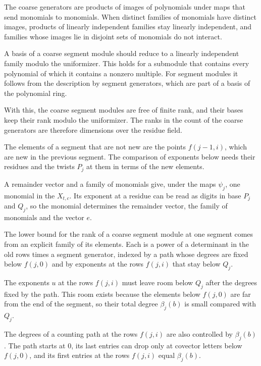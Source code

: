 The coarse generators are products of images of polynomials under maps that send monomials to monomials. When
distinct families of monomials have distinct images, products of linearly independent families stay linearly
independent, and families whose images lie in disjoint sets of monomials do not interact.

A basis of a coarse segment module should reduce to a linearly independent family modulo the uniformizer. This
holds for a submodule that contains every polynomial of which it contains a nonzero multiple. For segment modules
it follows from the description by segment generators, which are part of a basis of the polynomial ring.

With this, the coarse segment modules are free of finite rank, and their bases keep their rank modulo the
uniformizer. The ranks in the count of the coarse generators are therefore dimensions over the residue field.

The elements of a segment that are not new are the points $f(j-1,i)$, which are new in the previous segment. The
comparison of exponents below needs their residues and the twists $P_j$ at them in terms of the new elements.

A remainder vector and a family of monomials give, under the maps $\psi_j$, one monomial in the $X_{t,c}$. Its
exponent at a residue can be read as digits in base $P_j$ and $Q_j$, so the monomial determines the remainder vector,
the family of monomials and the vector $e$.

The lower bound for the rank of a coarse segment module at one segment comes from an explicit family of its
elements. Each is a power of a determinant in the old rows times a segment generator, indexed by a path whose
degrees are fixed below $f(j,0)$ and by exponents at the rows $f(j,i)$ that stay below $Q_j$.

The exponents $u$ at the rows $f(j,i)$ must leave room below $Q_j$ after the degrees fixed by the path. This room exists
because the elements below $f(j,0)$ are far from the end of the segment, so their total degree $\beta_j(b)$ is small
compared with $Q_j$.

The degrees of a counting path at the rows $f(j,i)$ are also controlled by $\beta_j(b)$. The path starts at $0$, its last
entries can drop only at covector letters below $f(j,0)$, and its first entries at the rows $f(j,i)$ equal $\beta_j(b)$.

